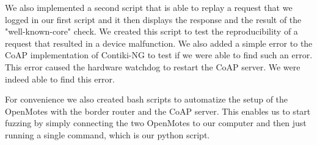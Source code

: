 We also implemented a second script that is able to replay a request that we logged in our first script and it then displays the response and the result of the "well-known-core" check. We created this script to test the reproducibility of a request that resulted in a device malfunction. We also added a simple error to the CoAP implementation of Contiki-NG to test if we were able to find such an error. This error caused the hardware watchdog to restart the CoAP server. We were indeed able to find this error.

For convenience we also created bash scripts to automatize the setup of the OpenMotes with the border router and the CoAP server. This enables us to start fuzzing by simply connecting the two OpenMotes to our computer and then just running a single command, which is our python script.
